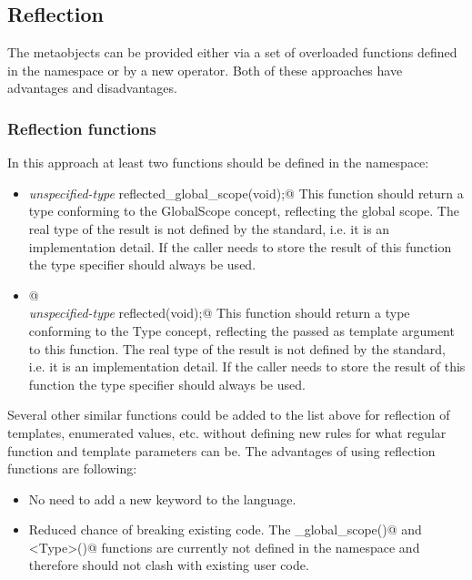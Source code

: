 \subsection{Reflection}

The metaobjects can be provided either via a set of overloaded
functions defined in the \verb@std@ namespace or by a new operator.
Both of these approaches have advantages and disadvantages.

\subsubsection{Reflection functions}

In this approach at least two functions should be defined
in the \verb@std@ namespace:

\begin{itemize}
	\item{{\em unspecified-type} \verb@ reflected_global_scope(void);@}
	This function should return a type conforming to the {\metaobject GlobalScope}
	concept, reflecting the global scope.
	The real type of the result is not defined by the standard, i.e. it is an implementation detail. 
	If the caller needs to store the result of this function the \verb@auto@ type
	specifier should always be used.

	\item{\verb@template <typename Type>@\\
	{\em unspecified-type} \verb@ reflected(void);@}
	This function should return a type conforming to the {\metaobject Type}
	concept, reflecting the \verb@Type@ passed as template argument to this function.
	The real type of the result is not defined by the standard, i.e. it is an implementation detail. 
	If the caller needs to store the result of this function the \verb@auto@ type
	specifier should always be used.
\end{itemize}

Several other similar functions could be added to the list above
for reflection of templates, enumerated values, etc. without defining
new rules for what regular function and template parameters can be.
The advantages of using reflection functions are following:

\begin{itemize}
	\item No need to add a new keyword to the language.

	\item Reduced chance of breaking existing code. The \verb@reflected_global_scope()@
	and \verb@reflected<Type>()@ functions are currently not defined in the \verb@std@
	namespace and therefore should not clash with existing user code.
\end{itemize}


